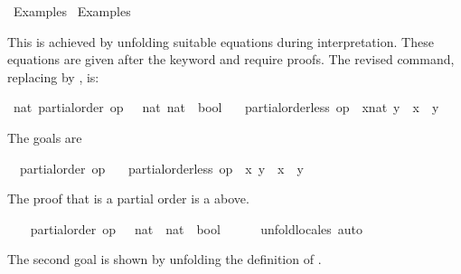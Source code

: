 %
\begin{isabellebody}%
\def\isabellecontext{Examples{\isadigit{2}}}%
%
\isadelimtheory
\isanewline
\isanewline
%
\endisadelimtheory
%
\isatagtheory
{}\isamarkupfalse%
\ Examples{}\isanewline
{}\ Examples\isanewline
{}%
\endisatagtheory
{\isafoldtheory}%
%
\isadelimtheory
%
\endisadelimtheory
%
\begin{isamarkuptext}%
This is achieved by unfolding suitable equations during
  interpretation.  These equations are given after the keyword
   and require proofs.  The revised command,
  replacing \isa{{\isasymsqsubset}} by \isa{{\isacharless}}, is:%
\end{isamarkuptext}%
\isamarkuptrue%
%
\isadelimvisible
%
\endisadelimvisible
%
\isatagvisible
{}\isamarkupfalse%
\ nat{\isacharcolon}\ partial{\isacharunderscore}order\ {\isachardoublequoteopen}op\ {\isasymle}\ {\isacharcolon}{\isacharcolon}\ {\isacharbrackleft}nat{\isacharcomma}\ nat{\isacharbrackright}\ {\isasymRightarrow}\ bool{\isachardoublequoteclose}\isanewline
\ \ \ {\isachardoublequoteopen}partial{\isacharunderscore}order{\isachardot}less\ op\ {\isasymle}\ {\isacharparenleft}x{\isacharcolon}{\isacharcolon}nat{\isacharparenright}\ y\ {\isacharequal}\ {\isacharparenleft}x\ {\isacharless}\ y{\isacharparenright}{\isachardoublequoteclose}\isanewline
{}\isamarkupfalse%
\ {\isacharminus}%
\begin{isamarkuptxt}%
The goals are \begin{isabelle}%
\ {}{\isachardot}\ partial{\isacharunderscore}order\ op\ {\isasymle}\isanewline
\ {}{\isachardot}\ partial{\isacharunderscore}order{\isachardot}less\ op\ {\isasymle}\ x\ y\ {\isacharequal}\ {\isacharparenleft}x\ {\isacharless}\ y{\isacharparenright}%
\end{isabelle}
    The proof that \isa{{\isasymle}} is a partial order is a above.%
\end{isamarkuptxt}%
\isamarkuptrue%
\ \ \isamarkupfalse%
\ {\isachardoublequoteopen}partial{\isacharunderscore}order\ {\isacharparenleft}op\ {\isasymle}\ {\isacharcolon}{\isacharcolon}\ nat\ {\isasymRightarrow}\ nat\ {\isasymRightarrow}\ bool{\isacharparenright}{\isachardoublequoteclose}\isanewline
\ \ \ \ \isamarkupfalse%
\ unfold{\isacharunderscore}locales\ auto%
\begin{isamarkuptxt}%
The second goal is shown by unfolding the
    definition of .%

\end{isamarkuptxt}
\end{isabellebody}
